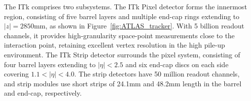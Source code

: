 The ITk comprises two subsystems. The ITk Pixel detector forms the innermost region, consisting of five barrel layers and multiple end-cap rings extending to $|z| = 2850$mm, as shown in Figure~\ref{fig:ATLAS_tracker}. With 5 billion readout channels, it provides high-granularity space-point measurements close to the interaction point, retaining excellent vertex resolution in the high pile-up environment. The ITk Strip detector surrounds the pixel system, consisting of four barrel layers extending to $|\eta| < 2.5$ and six end-cap discs on each side covering $1.1 < |\eta| < 4.0$. The strip detectors have 50 million readout channels, and strip modules use short strips of 24.1mm and 48.2mm length in the barrel and end-cap, respectively.


\lipsum[1]
